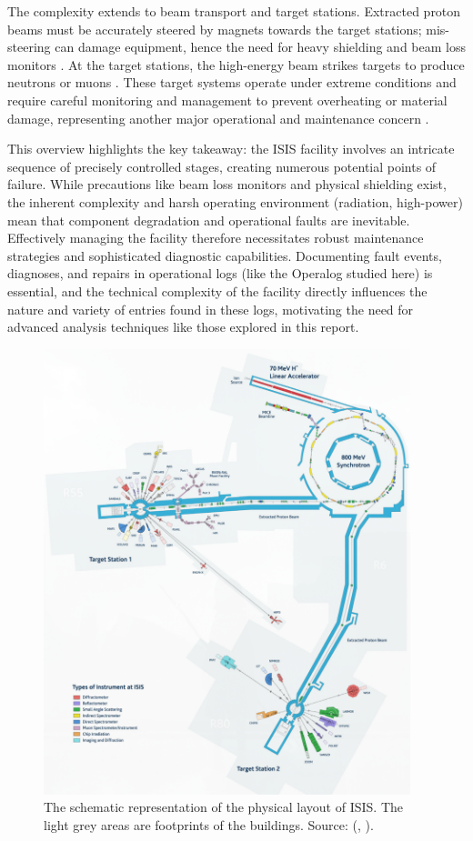 \documentclass[10pt,oneside]{report}
\renewcommand{\citet}[1]{\citeauthor{#1}, \citeyear{#1}}
\begin{document}
The complexity extends to beam transport and target stations. Extracted proton beams must be accurately steered by magnets towards the target stations; mis-steering can damage equipment, hence the need for heavy shielding and beam loss monitors \cite{2021practicalguide}. At the target stations, the high-energy beam strikes targets to produce neutrons or muons \cite{sharma2001nuclear, 2021practicalguide}. These target systems operate under extreme conditions and require careful monitoring and management to prevent overheating or material damage, representing another major operational and maintenance concern \cite{2021practicalguide}.

\noindent This overview highlights the key takeaway: the ISIS facility involves an intricate sequence of precisely controlled stages, creating numerous potential points of failure. While precautions like beam loss monitors and physical shielding exist, the inherent complexity and harsh operating environment (radiation, high-power) mean that component degradation and operational faults are inevitable. Effectively managing the facility therefore necessitates robust maintenance strategies and sophisticated diagnostic capabilities. Documenting fault events, diagnoses, and repairs in operational logs (like the Operalog studied here) is essential, and the technical complexity of the facility directly influences the nature and variety of entries found in these logs, motivating the need for advanced analysis techniques like those explored in this report.

\begin{figure}[htbp]
    \centering
    \includegraphics[width=0.95\textwidth]{ISIS.png}
    \caption{The schematic representation of the physical layout of ISIS. The light grey areas are footprints of the buildings. Source: (\citet{thomason2019isis}).}\label{fig:isis}
\end{figure}
\end{document}
